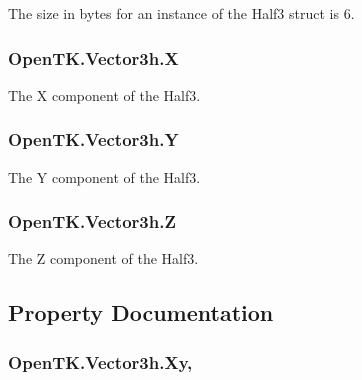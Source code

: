 The size in bytes for an instance of the Half3 struct is 6.

\hypertarget{struct_open_t_k_1_1_vector3h_a3ddede79fc645c3cf8798c5333241082}{
\subsubsection[{X}]{ Open\-T\-K.\-Vector3h.\-X}}\label{struct_open_t_k_1_1_vector3h_a3ddede79fc645c3cf8798c5333241082}


The X component of the Half3.

\hypertarget{struct_open_t_k_1_1_vector3h_acfde1ca81a6ea60fea78e4baf2f7ea6e}{
\subsubsection[{Y}]{ Open\-T\-K.\-Vector3h.\-Y}}\label{struct_open_t_k_1_1_vector3h_acfde1ca81a6ea60fea78e4baf2f7ea6e}


The Y component of the Half3.

\hypertarget{struct_open_t_k_1_1_vector3h_a78817af944696985fde275c56bd905ea}{
\subsubsection[{Z}]{ Open\-T\-K.\-Vector3h.\-Z}}\label{struct_open_t_k_1_1_vector3h_a78817af944696985fde275c56bd905ea}


The Z component of the Half3.



\subsection{Property Documentation}
\hypertarget{struct_open_t_k_1_1_vector3h_add028391e6cdead82cc69f2e1af1e1e7}{
\subsubsection[{Xy}]{ Open\-T\-K.\-Vector3h.\-Xy\hspace{0.3cm}{\ttfamily [get]}, {\ttfamily [set]}}}\label{struct_open_t_k_1_1_vector3h_add028391e6cdead82cc69f2e1af1e1e7}


